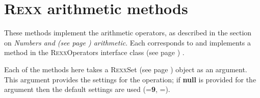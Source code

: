 \section{R\textsc{exx} arithmetic methods}\label{refrexxops}
 These methods implement the \nr{} arithmetic operators, as
described in the section on  \emph{Numbers and (see page \pageref{refnums}) 
arithmetic}.
Each corresponds to and implements a
method in the  R\textsc{exx}Operators interface class (see page \pageref{refnlrops}) .
 
Each of the methods here takes a  R\textsc{exx}Set (see page \pageref{refnlrset})  object as
an argument.  This argument provides the  settings for
the operation; if \textbf{null} is provided for the argument then the
default settings are used (=\textbf{9},
=).
 
